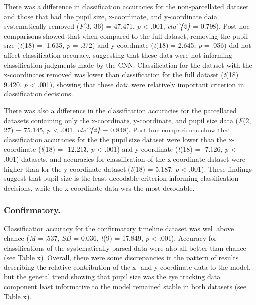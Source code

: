 \documentclass[
  english,
  man]{apa6}
\begin{document}
There was a difference in classification accuracies for the non-parcellated dataset and those that had the pupil size, x-coordinate, and y-coordinate data systematically removed (\emph{F}(3, 36) = 47.471, \emph{p} \textless{} .001, \emph{eta\^{}\{2\}} = 0.798). Post-hoc comparisons showed that when compared to the full dataset, removing the pupil size (\emph{t}(18) = -1.635, \emph{p} = .372) and y-coordinate (\emph{t}(18) = 2.645, \emph{p} = .056) did not affect classification accuracy, suggesting that these data were not informing classification judgments made by the CNN. Classification for the dataset with the x-coordinates removed was lower than classification for the full dataset (\emph{t}(18) = 9.420, \emph{p} \textless{} .001), showing that these data were relatively important criterion in classification decisions.

There was also a difference in the classification accuracies for the parcellated datasets containing only the x-coordinate, y-coordinate, and pupil size data (\emph{F}(2, 27) = 75.145, \emph{p} \textless{} .001, \emph{eta\^{}\{2\}} = 0.848). Post-hoc comparisons show that classification accuracies for the the pupil size dataset were lower than the x-coordinate (\emph{t}(18) = -12.213, \emph{p} \textless{} .001) and y-coordinate (\emph{t}(18) = -7.026, \emph{p} \textless{} .001) datasets, and accuracies for classification of the x-coordinate dataset were higher than for the y-coordinate dataset (\emph{t}(18) = 5.187, \emph{p} \textless{} .001). These findings suggest that pupil size is the least decodable criterion informing classification decisions, while the x-coordinate data was the most decodable.

\subsubsection{Confirmatory.}

Classification accuracy for the confirmatory timeline dataset was well above chance (\emph{M} = .537, \emph{SD} = 0.036, \emph{t}(9) = 17.849, \emph{p} \textless{} .001). Accuracy for classifications of the systematically parsed data were also all better than chance (see Table x). Overall, there were some discrepancies in the pattern of results describing the relative contribution of the x- and y-coordinate data to the model, but the general trend showing that pupil size was the eye tracking data component least informative to the model remained stable in both datasets (see Table x).
\end{document}
